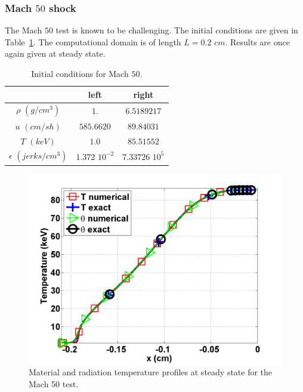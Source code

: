 \documentclass[review]{elsarticle}
\newcommand{\tbl}[1]{Table~\ref{#1}}                     %
\begin{document}
\subsubsection{Mach $50$ shock} 

The Mach $50$ test is known to be challenging. The initial conditions are given in \tbl{tbl:table7}. The computational domain is of length $L=0.2$ $cm$. Results are once again given at steady state.
\begin{table}[H]
\caption{\label{tbl:table7} Initial conditions for Mach $50$.}
\begin{center}
\begin{tabular}{|c|c|c|}
\hline 
 & left  & right \\ \hline
$\rho$ $(g/cm^3)$ &$1.$ & $6.5189217$ \\ \hline
$u$ $(cm/sh)$& $585.6620$ & $89.84031$ \\ \hline
$T$ $(keV)$& $1.0$ & $85.51552$\\ \hline
$\epsilon$ $(jerks/cm^3)$ & $1.372$ $10^{-2}$ & $7.33726$ $10^{5}$\\
\hline
\end{tabular}  
\end{center}  
\end{table}
\begin{figure}[H]
                \centering
                \includegraphics[width=\textwidth]{figs/Mach_50_nel_1000_temperature.png}
        \caption{Material and radiation temperature profiles at steady state for the Mach 50 test.}\label{fig:Mach50_temp}
\end{figure}
\end{document}
